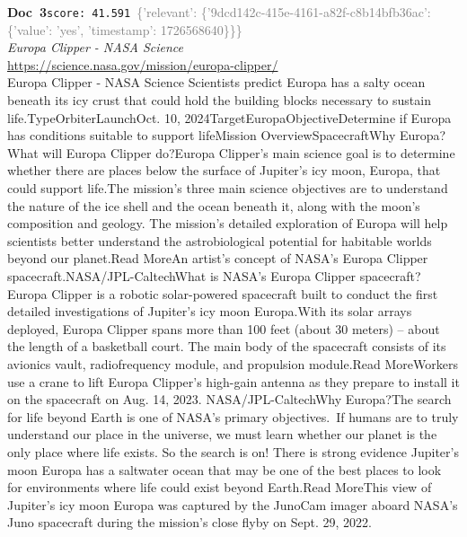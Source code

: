 \documentclass[a4paper,11pt]{article}
\begin{document}
\begin{docenv}
{\footnotesize\textcolor{doccolor}{\textbf{Doc~3}}}\hfill{\tiny\texttt{score:~41.591}}\ {\tiny\textcolor{gray}{\{'relevant': \{'9dcd142c-415e-4161-a82f-c8b14bfb36ac': \{'value': 'yes', 'timestamp': 1726568640\}\}\}}}\\[3pt]
{\small\textit{Europa Clipper - NASA Science}}\\[2pt]
{\tiny\url{https://science.nasa.gov/mission/europa-clipper/}}\\[4pt]
{\footnotesize Europa Clipper - NASA Science
Scientists predict Europa has a salty ocean beneath its icy crust that could hold the building blocks necessary to sustain life.TypeOrbiterLaunchOct. 10, 2024TargetEuropaObjectiveDetermine if Europa has conditions suitable to support lifeMission OverviewSpacecraftWhy Europa?What will Europa Clipper do?Europa Clipper’s main science goal is to determine whether there are places below the surface of Jupiter’s icy moon, Europa, that could support life.The mission’s three main science objectives are to understand the nature of the ice shell and the ocean beneath it, along with the moon’s composition and geology. The mission’s detailed exploration of Europa will help scientists better understand the astrobiological potential for habitable worlds beyond our planet.Read MoreAn artist's concept of NASA’s Europa Clipper spacecraft.NASA/JPL-CaltechWhat is NASA’s Europa Clipper spacecraft?Europa Clipper is a robotic solar-powered spacecraft built to conduct the first detailed investigations of Jupiter's icy moon Europa.With its solar arrays deployed, Europa Clipper spans more than 100 feet (about 30 meters) – about the length of a basketball court. The main body of the spacecraft consists of its avionics vault, radiofrequency module, and propulsion module.Read MoreWorkers use a crane to lift Europa Clipper's high-gain antenna as they prepare to install it on the spacecraft on Aug. 14, 2023. NASA/JPL-CaltechWhy Europa?The search for life beyond Earth is one of NASA’s primary objectives. If humans are to truly understand our place in the universe, we must learn whether our planet is the only place where life exists. So the search is on! There is strong evidence Jupiter's moon Europa has a saltwater ocean that may be one of the best places to look for environments where life could exist beyond Earth.Read MoreThis view of Jupiter’s icy moon Europa was captured by the JunoCam imager aboard NASA’s Juno spacecraft during the mission’s close flyby on Sept. 29, 2022.}
\end{docenv}
\end{document}
